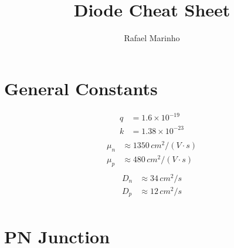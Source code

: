 \documentclass{article}
\title{Diode Cheat Sheet}
\author{Rafael Marinho}
\date{}
\begin{document}
\maketitle
\section*{General Constants}
\begin{multicols}{3}
\noindent
\begin{align*}
q &= 1.6\times10^{-19}\\
k &= 1.38\times10^{-23}\\
\end{align*}
\begin{align*}
\mu_n &\approx 1350\,cm^2/(V\cdot s)\\
\mu_p &\approx 480\,cm^2/(V\cdot s)\\
\end{align*}
\begin{align*}
D_n &\approx 34\,cm^2/s\\
D_p &\approx 12\,cm^2/s\\
\end{align*}
\end{multicols}
\section*{PN Junction}
\end{document}
